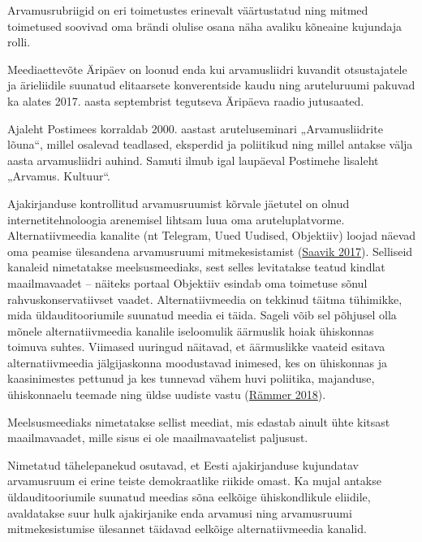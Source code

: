 \documentclass[estonian,]{article}
\begin{document}
\begin{casebox}
Arvamusrubriigid on eri toimetustes erinevalt väärtustatud ning mitmed
toimetused soovivad oma brändi olulise osana näha avaliku kõneaine
kujundaja rolli.

Meediaettevõte Äripäev on loonud enda kui arvamusliidri kuvandit
otsustajatele ja ärieliidile suunatud elitaarsete konverentside kaudu
ning aruteluruumi pakuvad ka alates 2017. aasta septembrist tegutseva
Äripäeva raadio jutusaated.

Ajaleht Postimees korraldab 2000. aastast aruteluseminari
„Arvamusliidrite lõuna``, millel osalevad teadlased, eksperdid ja
poliitikud ning millel antakse välja aasta arvamusliidri auhind. Samuti
ilmub igal laupäeval Postimehe lisaleht „Arvamus. Kultuur``.
\end{casebox}

Ajakirjanduse kontrollitud arvamusruumist kõrvale jäetutel on olnud internetitehnoloogia arenemisel lihtsam luua oma aruteluplatvorme. Alternatiivmeedia kanalite (nt Telegram, Uued Uudised, Objektiiv) loojad näevad oma peamise ülesandena arvamusruumi mitmekesistamist (\protect\hyperlink{Saavik2017}{Saavik 2017}). Selliseid kanaleid nimetatakse meelsusmeediaks, sest selles levitatakse teatud kindlat maailmavaadet -- näiteks portaal Objektiiv esindab oma toimetuse sõnul rahvuskonservatiivset vaadet. Alternatiivmeedia on tekkinud täitma tühimikke, mida üldauditooriumile suunatud meedia ei täida. Sageli võib sel põhjusel olla mõnele alternatiivmeedia kanalile iseloomulik äärmuslik hoiak ühiskonnas toimuva suhtes. Viimased uuringud näitavad, et äärmuslikke vaateid esitava alternatiivmeedia jälgijaskonna moodustavad inimesed, kes on ühiskonnas ja kaasinimestes pettunud ja kes tunnevad vähem huvi poliitika, majanduse, ühiskonnaelu teemade ning üldse uudiste vastu (\protect\hyperlink{Ruxe4mmer2018}{Rämmer 2018}).

\begin{blockquote-right}
Meelsusmeediaks nimetatakse sellist meediat, mis edastab ainult ühte
kitsast maailmavaadet, mille sisus ei ole maailmavaatelist paljusust.
\end{blockquote-right}

Nimetatud tähelepanekud osutavad, et Eesti ajakirjanduse kujundatav arvamusruum ei erine teiste demokraatlike riikide omast. Ka mujal antakse üldauditooriumile suunatud meedias sõna eelkõige ühiskondlikule eliidile, avaldatakse suur hulk ajakirjanike enda arvamusi ning arvamusruumi mitmekesistumise ülesannet täidavad eelkõige alternatiivmeedia kanalid.
\end{document}
